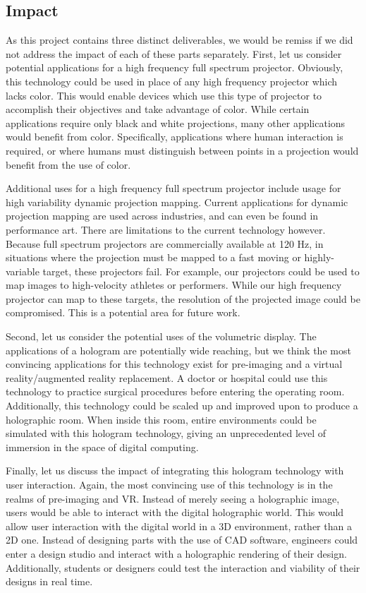 \documentclass[12pt]{article}
\begin{document}
\subsection{Impact}
As this project contains three distinct deliverables, we would be remiss if we did not address the impact of each of these parts separately. First, let us consider potential applications for a high frequency full spectrum projector. Obviously, this technology could be used in place of any high frequency projector which lacks color. This would enable devices which use this type of projector to accomplish their objectives and take advantage of color. While certain applications require only black and white projections, many other applications would benefit from color. Specifically, applications where human interaction is required, or where humans must distinguish between points in a projection would benefit from the use of color.

Additional uses for a high frequency full spectrum projector include usage for high variability dynamic projection mapping. Current applications for dynamic projection mapping are used across industries, and can even be found in performance art. There are limitations to the current technology however. Because full spectrum projectors are commercially available at 120 Hz, in situations where the projection must be mapped to a fast moving or highly-variable target, these projectors fail. For example, our projectors could be used to map images to high-velocity athletes or performers. While our high frequency projector can map to these targets, the resolution of the projected image could be compromised. This is a potential area for future work. 

Second, let us consider the potential uses of the volumetric display. The applications of a hologram are potentially wide reaching, but we think the most convincing applications for this technology exist for pre-imaging and a virtual reality/augmented reality replacement. A doctor or hospital could use this technology to practice surgical procedures before entering the operating room.  Additionally, this technology could be scaled up and improved upon to produce a holographic room. When inside this room, entire environments could be simulated with this hologram technology, giving an unprecedented level of immersion in the space of digital computing. 

Finally, let us discuss the impact of integrating this hologram technology with user interaction. Again, the most convincing use of this technology is in the realms of pre-imaging and VR. Instead of merely seeing a holographic image, users would be able to interact with the digital holographic world. This would allow user interaction with the digital world in a 3D environment, rather than a 2D one. Instead of designing parts with the use of CAD software, engineers could enter a design studio and interact with a holographic rendering of their design. Additionally, students or designers could test the interaction and viability of their designs in real time.
\end{document}
